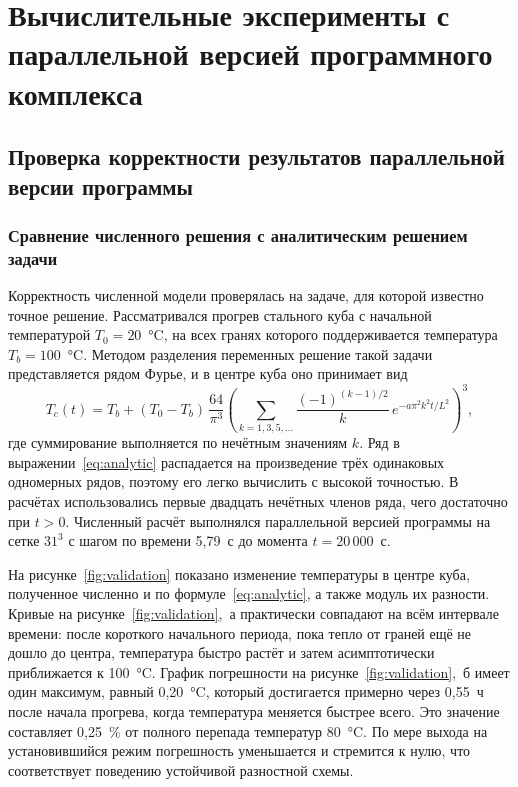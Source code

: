 \chapter{Вычислительные эксперименты с параллельной версией программного комплекса}

\section{Проверка корректности результатов параллельной версии программы}

\subsection{Сравнение численного решения с аналитическим решением задачи}

Корректность численной модели проверялась на задаче, для которой известно точное решение. Рассматривался прогрев стального куба с начальной температурой $T_0 = 20$~°C, на всех гранях которого поддерживается температура $T_b = 100$~°C. Методом разделения переменных решение такой задачи представляется рядом Фурье, и в центре куба оно принимает вид
\begin{equation}
    T_c(t) = T_b + (T_0 - T_b) \, \frac{64}{\pi^3} \left( \sum_{k = 1, 3, 5, \ldots} \frac{(-1)^{(k-1)/2}}{k} \, e^{-a \pi^2 k^2 t / L^2} \right)^{3},
    \label{eq:analytic}
\end{equation}
где суммирование выполняется по нечётным значениям $k$. Ряд в выражении~\eqref{eq:analytic} распадается на произведение трёх одинаковых одномерных рядов, поэтому его легко вычислить с высокой точностью. В расчётах использовались первые двадцать нечётных членов ряда, чего достаточно при $t > 0$. Численный расчёт выполнялся параллельной версией программы на сетке $31^3$ с шагом по времени 5,79~с до момента $t = 20\,000$~с.

На рисунке~\ref{fig:validation} показано изменение температуры в центре куба, полученное численно и по формуле~\eqref{eq:analytic}, а также модуль их разности. Кривые на рисунке~\ref{fig:validation},~а практически совпадают на всём интервале времени: после короткого начального периода, пока тепло от граней ещё не дошло до центра, температура быстро растёт и затем асимптотически приближается к 100~°C. График погрешности на рисунке~\ref{fig:validation},~б имеет один максимум, равный 0,20~°C, который достигается примерно через 0,55~ч после начала прогрева, когда температура меняется быстрее всего. Это значение составляет 0,25~\% от полного перепада температур 80~°C. По мере выхода на установившийся режим погрешность уменьшается и стремится к нулю, что соответствует поведению устойчивой разностной схемы.

